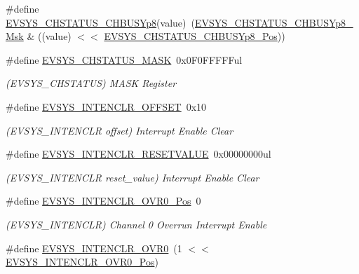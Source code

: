 \begin{DoxyCompactItemize}
\item 
\#define \mbox{\hyperlink{group___s_a_m_d21___e_v_s_y_s_gaa8d9feaad1c2838d4cdc0e1460e5cc6f}{E\+V\+S\+Y\+S\+\_\+\+C\+H\+S\+T\+A\+T\+U\+S\+\_\+\+C\+H\+B\+U\+S\+Yp8}}(value)~(\mbox{\hyperlink{group___s_a_m_d21___e_v_s_y_s_ga1cb9a317522810dfabdbbd733f260808}{E\+V\+S\+Y\+S\+\_\+\+C\+H\+S\+T\+A\+T\+U\+S\+\_\+\+C\+H\+B\+U\+S\+Yp8\+\_\+\+Msk}} \& ((value) $<$$<$ \mbox{\hyperlink{group___s_a_m_d21___e_v_s_y_s_gada12b1644128aac2e79ed2ba3faeab27}{E\+V\+S\+Y\+S\+\_\+\+C\+H\+S\+T\+A\+T\+U\+S\+\_\+\+C\+H\+B\+U\+S\+Yp8\+\_\+\+Pos}}))
\item 
\#define \mbox{\hyperlink{group___s_a_m_d21___e_v_s_y_s_ga969f2d9810912d2f07fe47602660dd7f}{E\+V\+S\+Y\+S\+\_\+\+C\+H\+S\+T\+A\+T\+U\+S\+\_\+\+M\+A\+SK}}~0x0\+F0\+F\+F\+F\+F\+Ful
\begin{DoxyCompactList}\small\item\em (E\+V\+S\+Y\+S\+\_\+\+C\+H\+S\+T\+A\+T\+US) M\+A\+SK Register \end{DoxyCompactList}\item 
\#define \mbox{\hyperlink{group___s_a_m_d21___e_v_s_y_s_gad616904587ebe8e1c3fb07142e8db5fa}{E\+V\+S\+Y\+S\+\_\+\+I\+N\+T\+E\+N\+C\+L\+R\+\_\+\+O\+F\+F\+S\+ET}}~0x10
\begin{DoxyCompactList}\small\item\em (E\+V\+S\+Y\+S\+\_\+\+I\+N\+T\+E\+N\+C\+LR offset) Interrupt Enable Clear \end{DoxyCompactList}\item 
\#define \mbox{\hyperlink{group___s_a_m_d21___e_v_s_y_s_gafb4ee0d51bdb48835ff631cb56a93534}{E\+V\+S\+Y\+S\+\_\+\+I\+N\+T\+E\+N\+C\+L\+R\+\_\+\+R\+E\+S\+E\+T\+V\+A\+L\+UE}}~0x00000000ul
\begin{DoxyCompactList}\small\item\em (E\+V\+S\+Y\+S\+\_\+\+I\+N\+T\+E\+N\+C\+LR reset\+\_\+value) Interrupt Enable Clear \end{DoxyCompactList}\item 
\#define \mbox{\hyperlink{group___s_a_m_d21___e_v_s_y_s_ga7be1d8ec8ebd796f7a965b29b44256b3}{E\+V\+S\+Y\+S\+\_\+\+I\+N\+T\+E\+N\+C\+L\+R\+\_\+\+O\+V\+R0\+\_\+\+Pos}}~0
\begin{DoxyCompactList}\small\item\em (E\+V\+S\+Y\+S\+\_\+\+I\+N\+T\+E\+N\+C\+LR) Channel 0 Overrun Interrupt Enable \end{DoxyCompactList}\item 
\#define \mbox{\hyperlink{group___s_a_m_d21___e_v_s_y_s_ga63b54e0793df11848d1ec5595e934b92}{E\+V\+S\+Y\+S\+\_\+\+I\+N\+T\+E\+N\+C\+L\+R\+\_\+\+O\+V\+R0}}~(1 $<$$<$ \mbox{\hyperlink{group___s_a_m_d21___e_v_s_y_s_ga7be1d8ec8ebd796f7a965b29b44256b3}{E\+V\+S\+Y\+S\+\_\+\+I\+N\+T\+E\+N\+C\+L\+R\+\_\+\+O\+V\+R0\+\_\+\+Pos}})

\end{DoxyCompactItemize}
